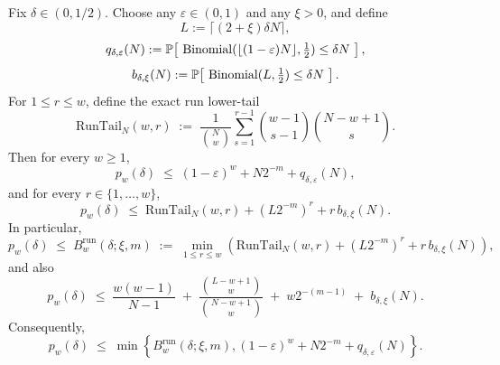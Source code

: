\begin{corollary}
\label{cor:dense-inner-piecewise}
Fix $\delta\in(0,1/2)$.
Choose any $\varepsilon\in(0,1)$ and any $\xi>0$, and define
\[
L:=\lceil(2+\xi)\delta N\rceil,
\]
\[
q_{\delta,\varepsilon}(N)
:=
\mathbb{P}\!\left[\ \operatorname{Binomial}(\lfloor(1-\varepsilon)N\rfloor,\tfrac12)\le \delta N\ \right],
\]
\[
b_{\delta,\xi}(N)
:=
\mathbb{P}\!\left[\ \operatorname{Binomial}(L,\tfrac12)\le \delta N\ \right].
\]
For $1\le r\le w$, define the exact run lower-tail
\[
\mathrm{RunTail}_N(w,r)
\;:=\;
\frac{1}{\binom{N}{w}}
\sum_{s=1}^{r-1}
\binom{w-1}{s-1}\binom{N-w+1}{s}.
\]
Then for every $w\ge 1$,
\begin{equation}
\label{eq:dense-inner-global-envelope}
p_w(\delta)
\;\le\;
(1-\varepsilon)^w + N2^{-m} + q_{\delta,\varepsilon}(N),
\end{equation}
and for every $r\in\{1,\dots,w\}$,
\begin{equation}
\label{eq:dense-inner-run-envelope}
p_w(\delta)
\;\le\;
\mathrm{RunTail}_N(w,r) + (L2^{-m})^r + r\,b_{\delta,\xi}(N).
\end{equation}
In particular,
\begin{equation}
\label{eq:dense-inner-run-opt-envelope}
p_w(\delta)
\;\le\;
B_w^{\mathrm{run}}(\delta;\xi,m)
\;:=\;
\min_{1\le r\le w}
\left(
\mathrm{RunTail}_N(w,r) + (L2^{-m})^r + r\,b_{\delta,\xi}(N)
\right),
\end{equation}
and also
\begin{equation}
\label{eq:dense-inner-smallw-envelope}
p_w(\delta)
\;\le\;
\frac{w(w-1)}{N-1}
\;+\;
\frac{\binom{L-w+1}{w}}{\binom{N-w+1}{w}}
\;+\;
w2^{-(m-1)}
\;+\;
b_{\delta,\xi}(N).
\end{equation}
Consequently,
\begin{equation}
\label{eq:dense-inner-best-envelope}
p_w(\delta)
\;\le\;
\min\!\left\{
B_w^{\mathrm{run}}(\delta;\xi,m),
(1-\varepsilon)^w + N2^{-m} + q_{\delta,\varepsilon}(N)
\right\}.
\end{equation}
\end{corollary}

